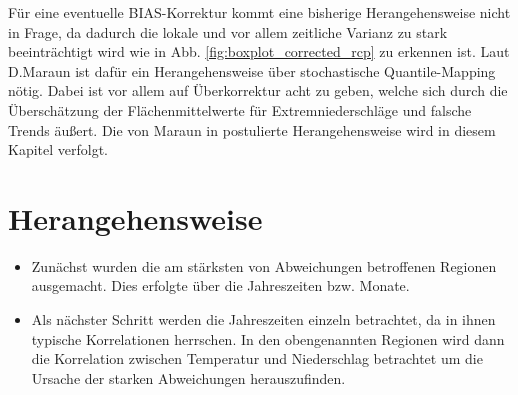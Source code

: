 Für eine eventuelle BIAS-Korrektur kommt eine bisherige Herangehensweise nicht in Frage, da dadurch die lokale und vor allem zeitliche Varianz zu stark beeinträchtigt wird wie in Abb. \ref{fig:boxplot_corrected_rcp} zu erkennen ist. Laut D.Maraun \cite{biasMaraun} ist dafür ein Herangehensweise über stochastische Quantile-Mapping nötig. Dabei ist vor allem auf Überkorrektur acht zu geben, welche sich durch die Überschätzung der Flächenmittelwerte für Extremniederschläge und falsche Trends äußert. Die von Maraun in \cite{biasMaraun} postulierte Herangehensweise wird in diesem Kapitel verfolgt.
\section{Herangehensweise}
\begin{itemize}
	\item Zunächst wurden die am stärksten von Abweichungen betroffenen Regionen ausgemacht. Dies erfolgte über die Jahreszeiten bzw. Monate.
	\item Als nächster Schritt werden die Jahreszeiten einzeln betrachtet, da in ihnen typische Korrelationen herrschen. In den obengenannten Regionen wird dann die Korrelation zwischen Temperatur und Niederschlag betrachtet um die Ursache der starken Abweichungen herauszufinden.
\end{itemize}

